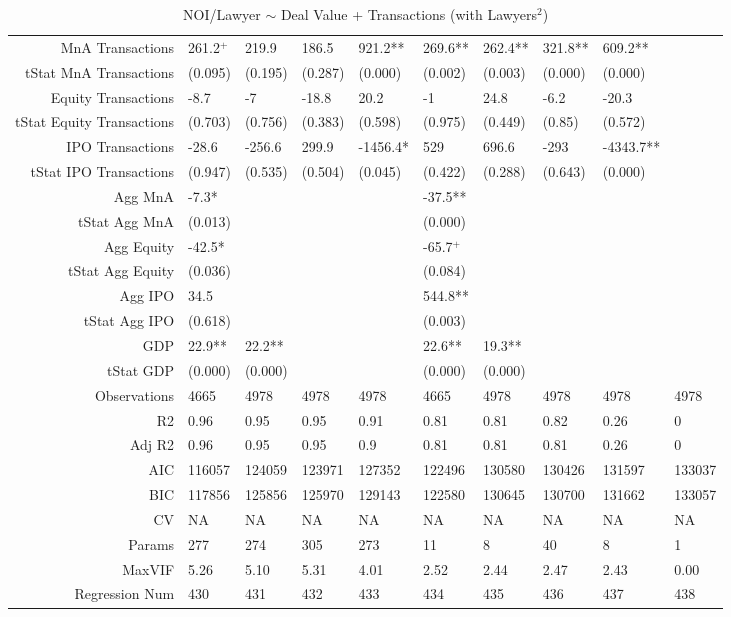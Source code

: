 \begin{table}[ht]
\begin{tabular}{rlllllllll}
  MnA Transactions & 261.2$^{+}$ & 219.9 & 186.5 & 921.2** & 269.6** & 262.4** & 321.8** & 609.2** &  \\ 
  tStat MnA Transactions & (0.095) & (0.195) & (0.287) & (0.000) & (0.002) & (0.003) & (0.000) & (0.000) &  \\ 
  Equity Transactions & -8.7 & -7 & -18.8 & 20.2 & -1 & 24.8 & -6.2 & -20.3 &  \\ 
  tStat Equity Transactions & (0.703) & (0.756) & (0.383) & (0.598) & (0.975) & (0.449) & (0.85) & (0.572) &  \\ 
  IPO Transactions & -28.6 & -256.6 & 299.9 & -1456.4* & 529 & 696.6 & -293 & -4343.7** &  \\ 
  tStat IPO Transactions & (0.947) & (0.535) & (0.504) & (0.045) & (0.422) & (0.288) & (0.643) & (0.000) &  \\ 
  Agg MnA & -7.3* &  &  &  & -37.5** &  &  &  &  \\ 
  tStat Agg MnA & (0.013) &  &  &  & (0.000) &  &  &  &  \\ 
  Agg Equity & -42.5* &  &  &  & -65.7$^{+}$ &  &  &  &  \\ 
  tStat Agg Equity & (0.036) &  &  &  & (0.084) &  &  &  &  \\ 
  Agg IPO & 34.5 &  &  &  & 544.8** &  &  &  &  \\ 
  tStat Agg IPO & (0.618) &  &  &  & (0.003) &  &  &  &  \\ 
  GDP & 22.9** & 22.2** &  &  & 22.6** & 19.3** &  &  &  \\ 
  tStat GDP & (0.000) & (0.000) &  &  & (0.000) & (0.000) &  &  &  \\ 
  Observations & 4665 & 4978 & 4978 & 4978 & 4665 & 4978 & 4978 & 4978 & 4978 \\ 
  R2 & 0.96 & 0.95 & 0.95 & 0.91 & 0.81 & 0.81 & 0.82 & 0.26 & 0 \\ 
  Adj R2 & 0.96 & 0.95 & 0.95 & 0.9 & 0.81 & 0.81 & 0.81 & 0.26 & 0 \\ 
  AIC & 116057 & 124059 & 123971 & 127352 & 122496 & 130580 & 130426 & 131597 & 133037 \\ 
  BIC & 117856 & 125856 & 125970 & 129143 & 122580 & 130645 & 130700 & 131662 & 133057 \\ 
  CV & NA & NA & NA & NA & NA & NA & NA & NA & NA \\ 
  Params & 277 & 274 & 305 & 273 & 11 & 8 & 40 & 8 & 1 \\ 
  MaxVIF & 5.26 & 5.10 & 5.31 & 4.01 & 2.52 & 2.44 & 2.47 & 2.43 & 0.00 \\ 
  Regression Num & 430 & 431 & 432 & 433 & 434 & 435 & 436 & 437 & 438 \\ 
   \hline
\end{tabular}
\caption{NOI/Lawyer $\sim$ Deal Value + Transactions (with Lawyers$^2$)} 
\end{table}
